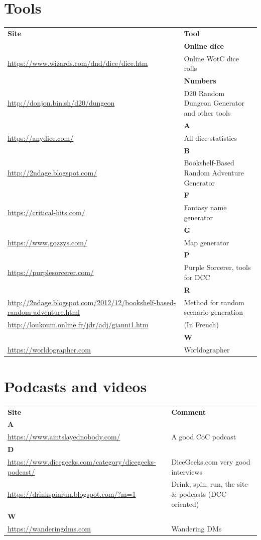 \documentclass[a4paper, 11pt, twoside]{article}
\begin{document}
\section{Tools}
\label{sec:org2e291fe}

\begin{longtable}{p{8cm}p{6cm}}
\textbf{Site} & \textbf{Tool}\\
 & \textbf{Online dice}\\
\url{https://www.wizards.com/dnd/dice/dice.htm} & Online WotC dice rolls\\
 & \textbf{Numbers}\\
\url{http://donjon.bin.sh/d20/dungeon} & D20 Random Dungeon Generator and other tools\\
 & \textbf{A}\\
\url{https://anydice.com/} & All dice statistics\\
 & \textbf{B}\\
\href{http://2ndage.blogspot.com/2012/12/bookshelf-based-random-adventure.html}{http://2ndage.blogspot.com/} & Bookshelf-Based Random Adventure Generator\\
 & \textbf{F}\\
\href{https://critical-hits.com/ch-presents/fantasy-name-generator/}{https://critical-hits.com/} & Fantasy name generator\\
 & \textbf{G}\\
\url{https://www.gozzys.com/} & Map generator\\
 & \textbf{P}\\
\url{https://purplesorcerer.com/} & Purple Sorcerer, tools for DCC\\
 & \textbf{R}\\
\url{http://2ndage.blogspot.com/2012/12/bookshelf-based-random-adventure.html} & Method for random scenario generation\\
\url{http://loukoum.online.fr/jdr/adj/gianni1.htm} & (In French)\\
 & \textbf{W}\\
\url{https://worldographer.com} & Worldographer\\
\end{longtable}

\section{Podcasts and videos}
\label{sec:org6f2ec2f}

\begin{longtable}{p{6cm}p{8cm}}
\textbf{Site} & \textbf{Comment}\\
\textbf{A} & \\
\url{https://www.aintslayednobody.com/} & A good CoC podcast\\
\textbf{D} & \\
\url{https://www.dicegeeks.com/category/dicegeeks-podcast/} & DiceGeeks.com very good interviews\\
\url{https://drinkspinrun.blogspot.com/?m=1} & Drink, spin, run, the site \& podcasts (DCC oriented)\\
\textbf{W} & \\
\url{https://wanderingdms.com} & Wandering DMs\\
\end{longtable}
\end{document}
